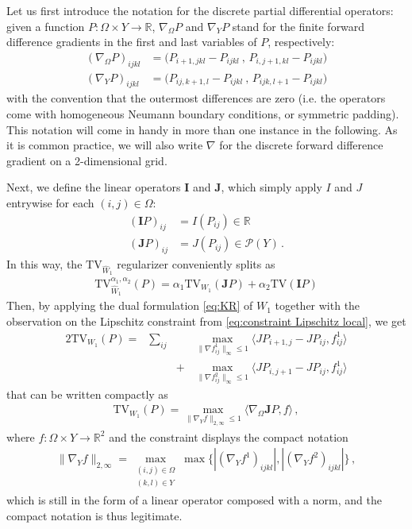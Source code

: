 \documentclass[journal,twoside,web]{ieeecolor}
\newcommand{\R}{\mathbb{R}}
\begin{document}
Let us first introduce the notation for the discrete partial differential operators: given a function $P:\Omega \times Y \to \R$, $\nabla_\Omega P$ and $\nabla_Y P$ stand for the finite forward difference gradients in the first and last variables of $P$, respectively:
\begin{align*}
    (\nabla_\Omega P)_{ijkl}
    & = \big(P_{i+1,jkl}-P_{ijkl} \ , \, P_{i,j+1,kl}-P_{ijkl} \big) \\
    (\nabla_Y P)_{ijkl}
    & = \big(P_{ij,k+1,l}-P_{ijkl} \ , \, P_{ijk,l+1}-P_{ijkl} \big)
\end{align*}
with the convention that the outermost differences are zero (i.e. the operators come with homogeneous Neumann boundary conditions, or symmetric padding). This notation will come in handy in more than one instance in the following. As it is common practice, we will also write $\nabla$ for the discrete forward difference gradient on a 2-dimensional grid.

Next, we define the linear operators $\mathbf{I}$ and $\mathbf{J}$, which simply apply $I$ and $J$ entrywise for each $(i,j)\in\Omega$:
\begin{align*}
    (\mathbf{I}P)_{ij} &= I(P_{ij}) \in \R \\
    (\mathbf{J}P)_{ij} &= J(P_{ij}) \in \mathcal{P}(Y) \, .
\end{align*}
In this way, the $\mathrm{TV}_{\hat{W}_1}$ regularizer conveniently splits as
\begin{align} \label{eq:TV unbalanced as sum of TVs}
    \mathrm{TV}_{\hat{W}_1}^{\alpha_1,\alpha_2}(P) = \alpha_1 \mathrm{TV}_{W_1}(\mathbf{J}P) + \alpha_2 \mathrm{TV}(\mathbf{I}P)
\end{align}
Then, by applying the dual formulation \eqref{eq:KR} of $W_1$ together with the observation on the Lipschitz constraint from \eqref{eq:constraint Lipschitz local}, we get
\begin{alignat*}{2}
    \mathrm{TV}_{{W}_1}(P) = & \sum_{ij} &   & \max_{\| \nabla f^1_{ij} \|_\infty \le 1} \langle         JP_{i+1,j} - JP_{ij} , f^1_{ij} \rangle \\
                        &           & + & \max_{\| \nabla f^2_{ij} \|_\infty \le 1} \langle JP_{i,j+1} - JP_{ij} , f^1_{ij} \rangle
\end{alignat*}
that can be written compactly as
\begin{align} \label{eq:TV_W1 temporary}
\mathrm{TV}_{{W}_1}(P) = \max_{\| \nabla_Y f \|_{2,\infty} \le 1} \langle \nabla_\Omega \mathbf{J} P , f \rangle \, ,
\end{align}
where $f:\Omega \times Y \to \R^2$ and the constraint displays the compact notation
\begin{align} \label{eq:norm 2,infty for lipschitz constraint}
    \| \nabla_Y f \|_{2,\infty} = \max_{ \substack{ (i,j) \in \Omega \\ (k,l) \in Y } } \max  \big\{  |(\nabla_Y f^1)_{ijkl}|, |(\nabla_Y f^2)_{ijkl}| \big\} \, ,
\end{align}
which is still in the form of a linear operator composed with a norm, and the compact notation is thus legitimate.
\end{document}
